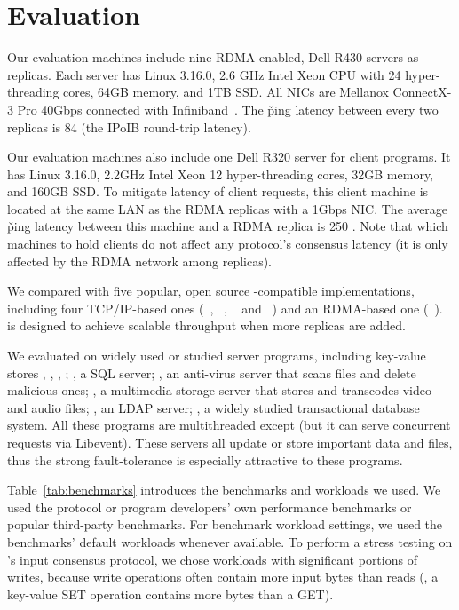 \section{Evaluation} \label{sec:evaluation}





Our evaluation machines include nine RDMA-enabled, Dell R430 servers as \paxos 
replicas. Each server has Linux 3.16.0, 2.6 GHz Intel Xeon CPU with 24 
hyper-threading cores, 64GB memory, and 1TB SSD. All NICs are Mellanox 
ConnectX-3 Pro 40Gbps connected with Infiniband~\cite{infiniband}. 
The \v{ping} latency between every two replicas is 84 \us (the IPoIB 
round-trip latency).
%

Our evaluation machines also include one Dell R320 server for client programs. 
It has Linux 3.16.0, 2.2GHz Intel Xeon 12 hyper-threading cores, 32GB memory, 
and 160GB SSD. To mitigate latency of client requests, this client machine is 
located at the same LAN as the RDMA replicas with a 1Gbps NIC. The average 
\v{ping} latency between this machine and a RDMA replica is 250 \us. Note that 
which machines to hold clients do not affect any \paxos protocol's consensus 
latency (it is only affected by the RDMA network among replicas).

We compared \xxx with five popular, open source \paxos-compatible 
implementations,
including four TCP/IP-based ones (\libpaxos~\cite{libpaxos},
\zookeeper~\cite{zookeeper}, \crane~\cite{crane:sosp15} and
\spaxos~\cite{spaxos:srds12}) and an RDMA-based one 
(\dare~\cite{dare:hpdc15}). \spaxos is designed to achieve scalable throughput 
when more replicas are added. 

We evaluated \xxx on \nprog widely used or studied server programs, including
\nkvprog key-value stores \redis, \memcached, \ssdb, \mongodb; \mysql, a SQL
server; \clamav, an anti-virus server that scans files and delete malicious ones;
\mediatomb, a multimedia storage server that stores and transcodes video and
audio files; \openldap, an LDAP server; \calvin, a widely studied transactional
database system. All these programs are multithreaded except \redis (but it can 
serve concurrent requests via Libevent). These servers all update or store 
important data and files, thus the strong \paxos fault-tolerance is especially 
attractive to these programs.


Table~\ref{tab:benchmarks} introduces the benchmarks and workloads we used. We 
used the protocol or program developers' own performance benchmarks or popular 
third-party benchmarks. For benchmark workload settings, we used the 
benchmarks' default workloads whenever available. To perform a stress testing 
on \xxx's input consensus protocol, we chose workloads with significant 
portions of writes, because write operations often contain more input bytes 
than reads (\eg, a key-value SET operation contains more bytes than a GET).

